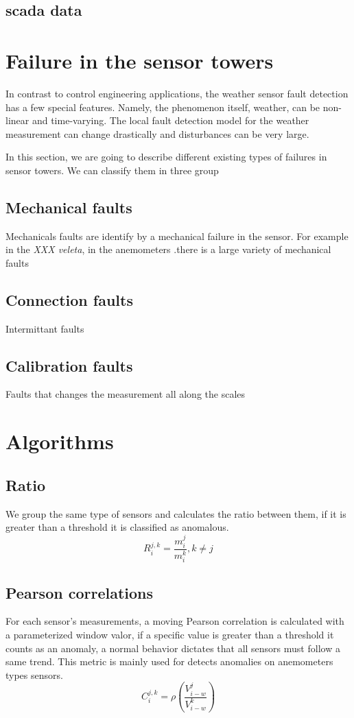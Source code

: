 \documentclass[journal]{IEEEtran}
\begin{document}
\subsection{scada data}\label{subsec:scadaData}

\section{Failure in the sensor towers}\label{sec:failures}
In contrast to control engineering applications, the weather sensor fault detection has a few special features. Namely, the phenomenon itself, weather, can be non-linear and time-varying. The local fault detection model for the weather measurement can change drastically and disturbances can be very large.


In this section, we are going to describe different existing types of failures in sensor towers. We can classify them in three group
\subsection{Mechanical faults} Mechanicals faults are identify by a mechanical failure in the sensor. For example in the \emph{XXX veleta}, 
in the anemometers .there is a large variety of mechanical faults
\subsection{Connection  faults} Intermittant faults
\subsection{Calibration faults} Faults that changes the measurement all along the scales


\section{Algorithms}\label{sec:algorithms}
\subsection{Ratio}
We group the same type of sensors and calculates the ratio between them, if it is greater than a threshold it is classified as anomalous.
\[ R_{i}^{j,k} = \frac{m_{i}^{j}}{m_{i}^{k}}, k \neq j \]

\subsection{Pearson correlations}
For each sensor's measurements, a moving Pearson correlation is calculated with a parameterized window valor, if a specific value is greater than a threshold it counts as an anomaly, a normal behavior dictates that all sensors must follow a same trend. This metric is mainly used for detects anomalies on anemometers types sensors. 
\[C_{i}^{j,k} = \rho(\frac{V_{i - w}^{j}}{V_{i - w}^{k}})  \]
\end{document}

